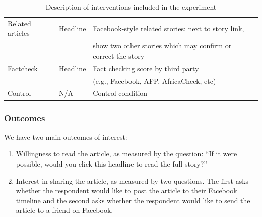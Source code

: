 \documentclass[letterpaper, 12pt, parskip=full,DIV=12]{scrartcl}
\begin{document}
\begin{table}[htb!]
\begin{tabular}{l|l|l}
Related articles                                                                                                       & Headline                                                                                                     & Facebook-style related stories: next to story link,\\ & & show two other stories which may confirm or correct the story                                                                                                                                                                                                                                                                                               \\
Factcheck                                                                                                      & Headline                                                                                                     & Fact checking score by third party\\ & & (e.g., Facebook, AFP, AfricaCheck, etc)
 \\
Control                                                                                                        & N/A                                                                                                          & Control condition                                                                                                                                                                                                                                                                                                                                                                                              
\end{tabular}
\caption{Description of interventions included in the experiment}
\label{tab:treatments}
\end{table}



\subsubsection{Outcomes}
We have two main outcomes of interest:

\begin{enumerate}
\item Willingness to read the article, as measured by the question: ``If it were possible, would you click this headline to read the full story?''
\item Interest in sharing the article, as measured by two questions. The first asks whether the respondent would like to post the article to their Facebook timeline and the second asks whether the respondent would like to send the article to a friend on Facebook. 
\end{enumerate}
\end{document}
